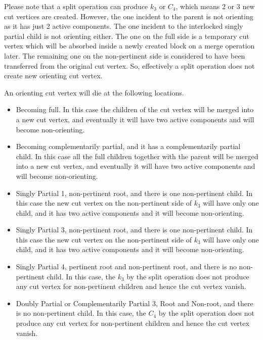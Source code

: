\documentclass[a4]{jgaa-art}
\begin{document}
\begin{appendices}
   Please note that a split operation can produce $k_3$ or $C_4$, which means 2 or 3 new cut vertices
   are created. However, the one incident to the parent is not orienting as it has just 2 active components.
   The one incident to the interlocked singly partial child is not orienting either.
   The one on the full side is a temporary cut vertex which will be absorbed inside a newly created 
   block on a merge operation later. The remaining one on the non-pertinent side is considered to have been
   transferred from the original cut vertex. So, effectively a split operation does not create new orienting cut vertex.

   An orienting cut vertex will die at the following locations.
   \begin{itemize}
   \item Becoming full. In this case the children of the cut vertex will be merged into a new cut vertex,
   and eventually it will have two active components and will become non-orienting.

   \item Becoming complementarily partial, and it has a complementarily partial child.
   In this case all the full children together with the parent will be merged into a new cut vertex,
   and eventually it will have two active components and will become non-orienting.

   \item Singly Partial 1, non-pertinent root, and there is one non-pertinent child. In this case the new cut vertex
   on the non-pertinent side of $k_3$ will have only one child, and it has two active components and it 
   will become non-orienting.

   \item Singly Partial 3, non-pertinent root, and there is one non-pertinent child. In this case the new cut vertex
   on the non-pertinent side of $k_3$ will have only one child, and it has two active components and it 
   will become non-orienting.

   \item Singly Partial 4, pertinent root and non-pertinent root, and there is no non-pertinent child. In this case, the $k_3$ by the split
   operation does not produce any cut vertex for non-pertinent children and hence the cut vertex vanish.

   \item Doubly Partial or Complementarily Partial 3, Root and Non-root, and there is no non-pertinent child. 
In this case, the $C_4$ by the split
   operation does not produce any cut vertex for non-pertinent children and hence the cut vertex vanish.
   \end{itemize}


\end{appendices}
\end{document}
